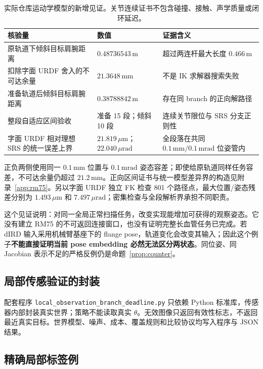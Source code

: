 \documentclass[11pt,a4paper]{article}
\theoremstyle{cn}
\newcommand{\mm}{\,\mathrm{mm}}
\begin{document}
\begin{table}[htbp]
\centering\small
\begin{tabularx}{\linewidth}{@{}p{.39\linewidth}p{.24\linewidth}X@{}}
\toprule
核验量 & 数值 & 证据含义\\
\midrule
原轨道下倾斜目标肩腕距离 & \(0.48736543\,\mathrm m\) & 超过两连杆最大长度 \(0.466\,\mathrm m\)\\
扣除字面 URDF 舍入的不可达余量 & \(21.3648\mm\) & 不是 IK 求解器搜索失败\\
准备轨道后倾斜目标肩腕距离 & \(0.38788842\,\mathrm m\) & 存在同 branch 的正向解路径\\
整段自适应区间验收 & 准备 15 段；倾斜 10 段 & 连续关节限位与 SRS 分支正则性\\
字面 URDF 相对理想 SRS 的统一误差上界 & \(21.819\,\mu\mathrm m\)；\(22.040\,\mu\mathrm{rad}\) & 全段落在共同 \(0.1\mm/0.1\,\mathrm{mrad}\) 位姿管内\\
\bottomrule
\end{tabularx}
\caption{实际仓库运动学模型的新增见证。关节连续证书不包含碰撞、接触、声学质量或闭环延迟。}
\end{table}

正负两侧使用同一 \(0.1\mm\) 位置与 \(0.1\,\mathrm{mrad}\) 姿态容差；即使给原轨道同样任务容差，不可达余量仍超过 \(21.2\mm\)。正向区间证书与统一模型差异界的构造见附录~\ref{app:rm75}。另以字面 URDF 独立 FK 检查 801 个路径点，最大位置/姿态残差分别为 \(1.493\,\mu\mathrm m\) 和 \(7.497\,\mu\mathrm{rad}\)；密集检查与全段解析界承担不同职责。

这个见证说明：对同一全局正常扫描任务，改变实现能增加可获得的观察姿态。它没有建立 RM75 的不可返回连接窗口，也没有证明完整长血管任务已完成。若 dIRD 输入采用机械臂基座下的 flange pose，轨道变化会改变其输入；因此这个例子\textbf{不能直接证明当前 pose embedding 必然无法区分两状态}。同位姿、同 Jacobian 表示不足的严格反例仍是命题~\ref{prop:counter}。

\subsection{局部传感验证的封装}

配套程序 \texttt{local\_observation\_branch\_deadline.py} 只依赖 Python 标准库，传感器内部封装真实世界；策略不能读取真实 \(\theta\)。无效图像只返回有效性标志，不返回最近真实目标。世界模型、噪声、成本、覆盖规则和比较协议均写入程序与 JSON 结果。

\subsection{精确局部标签例}
\end{document}
